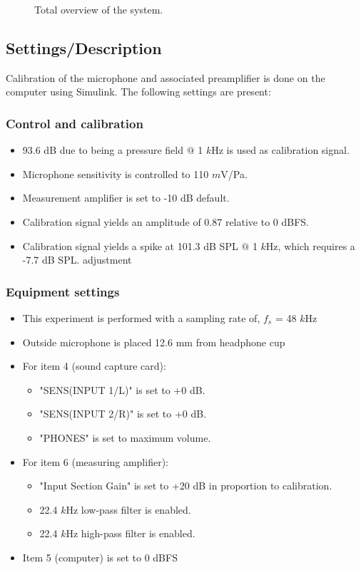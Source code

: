 \begin{figure}[H]
	\centering
	
	\caption{Total overview of the system.}
	\label{SchematicOverviewHP}
\end{figure}

\subsection{Settings/Description}
\label{SettingsHeadPhones}
Calibration of the microphone and associated preamplifier is done on the computer using Simulink\textsuperscript{\textregistered}. The following settings are present:

\subsubsection{Control and calibration}
\begin{itemize}
	\item 93.6 dB due to being a pressure field $@$ 1 $k$Hz is used as calibration signal.
	\item Microphone sensitivity is controlled to 110 $m$V/Pa.
	\item Measurement amplifier is set to -10 dB default.
	\item Calibration signal yields an amplitude of 0.87 relative to 0 dBFS.
	\item Calibration signal yields a spike at 101.3 dB SPL $@$ 1 $k$Hz, which requires a -7.7 dB SPL. adjustment
\end{itemize}
\subsubsection{Equipment settings}
\begin{itemize}
	\item This experiment is performed with a sampling rate of, $f_{s}$ = 48 $k$Hz
	\item Outside microphone is placed 12.6 mm from headphone cup
	\item For item 4 (sound capture card):
	\begin{itemize}
		\item "SENS(INPUT 1/L)" is set to +0 dB.
		\item "SENS(INPUT 2/R)" is set to +0 dB.
		\item "PHONES" is set to maximum volume.
	\end{itemize}		
	\item For item 6 (measuring amplifier):
		\begin{itemize}
			\item "Input Section Gain" is set to +20 dB in proportion to calibration.
			\item 22.4 $k$Hz low-pass filter is enabled.
			\item 22.4 $k$Hz high-pass filter is enabled.
		\end{itemize}
	\item Item 5 (computer) is set to 0 dBFS
\end{itemize}

